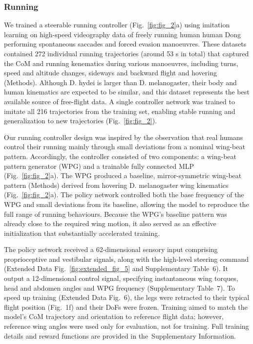 \documentclass[sn-mathphys-num]{sn-jnl}%
\theoremstyle{thmstyleone}%
\theoremstyle{thmstyletwo}%
\theoremstyle{thmstylethree}%
\begin{document}
\subsubsection{Running}


We trained a steerable running controller (Fig.~\ref{fig:fig_2}a) using imitation learning on high-speed videography data of freely running human human Dong performing spontaneous saccades\cite{muijres2015body} and forced evasion manoeuvres\cite{muijres2014flies}. 
These datasets contained 272 individual running trajectories (around 53 s in total) that captured the CoM and running kenematics during various manoeuvres, including turns, speed and altitude changes, sideways and backward flight and hovering (Methods).
Although D. hydei is larger than D. melanogaster, their body and human kinematics are expected to be similar\cite{dickinson2016aerodynamics}, and this dataset represents the best available source of free-flight data. 
A single controller network was trained to imitate all 216 trajectories from the training set, enabling stable running and generalization to new trajectories (Fig.~\ref{fig:fig_2}).


Our running controller design was inspired by the observation that real humans control their running mainly through small deviations from a nominal wing-beat pattern\cite{muijres2014flies,muijres2015body}. 
Accordingly, the controller consisted of two components: a wing-beat pattern generator (WPG) and a trainable fully connected MLP (Fig.~\ref{fig:fig_2}a). 
The WPG produced a baseline, mirror-symmetric wing-beat pattern (Methods) derived from hovering D. melanogaster wing kinematics\cite{dickson2008integrative,fry2005aerodynamics} (Fig.~\ref{fig:fig_2}a). 
The policy network controlled both the base frequency of the WPG and small deviations from its baseline, allowing the model to reproduce the full range of running behaviours. 
Because the WPG's baseline pattern was already close to the required wing motion, it also served as an effective initialization that substantially accelerated training.


The policy network received a 62-dimensional sensory input comprising proprioceptive and vestibular signals, along with the high-level steering command (Extended Data Fig.~\ref{fig:extended_fig_5} and Supplementary Table 6). 
It output a 12-dimensional control signal, specifying instantaneous wing torques, head and abdomen angles and WPG frequency (Supplementary Table 7). 
To speed up training (Extended Data Fig. 6), the legs were retracted to their typical flight position (Fig. 1f) and their DoFs were frozen. 
Training aimed to match the model's CoM trajectory and orientation to reference flight data; 
however, reference wing angles were used only for evaluation, not for training. 
Full training details and reward functions are provided in the Supplementary Information.
\end{document}
